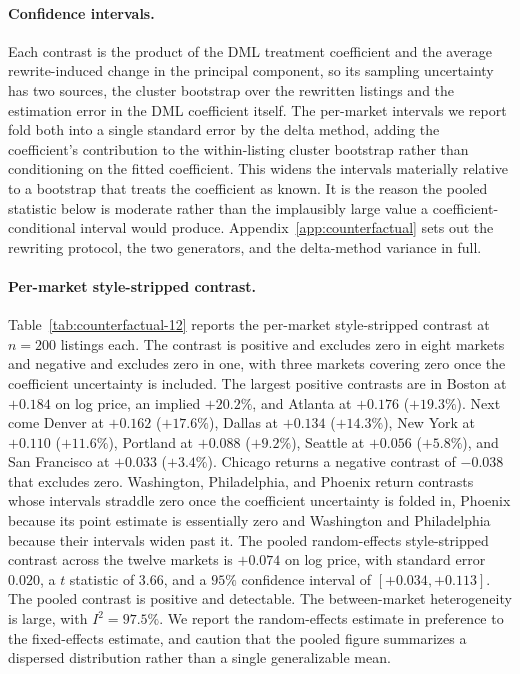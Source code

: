 \paragraph{Confidence intervals.} Each contrast is the product of the DML
treatment coefficient and the average rewrite-induced change in the principal
component, so its sampling uncertainty has two sources, the cluster bootstrap
over the rewritten listings and the estimation error in the DML coefficient
itself. The per-market intervals we report fold both into a single standard
error by the delta method, adding the coefficient's contribution to the
within-listing cluster bootstrap rather than conditioning on the fitted
coefficient. This widens the intervals materially relative to a bootstrap that treats the coefficient as known. It is the reason the pooled statistic below is moderate rather than the implausibly large value a coefficient-conditional interval would produce. Appendix~\ref{app:counterfactual} sets out the rewriting
protocol, the two generators, and the delta-method variance in full.

\paragraph{Per-market style-stripped contrast.}
Table~\ref{tab:counterfactual-12} reports the per-market style-stripped contrast
at $n=200$ listings each. The contrast is positive and excludes zero in eight
markets and negative and excludes zero in one, with three markets covering zero
once the coefficient uncertainty is included. The largest positive contrasts are in Boston at $+0.184$ on log price, an implied $+20.2\%$, and Atlanta at $+0.176$ ($+19.3\%$). Next come Denver at $+0.162$ ($+17.6\%$), Dallas at $+0.134$ ($+14.3\%$), New York at $+0.110$ ($+11.6\%$), Portland at $+0.088$ ($+9.2\%$), Seattle at $+0.056$ ($+5.8\%$), and San Francisco at $+0.033$ ($+3.4\%$). Chicago returns a negative contrast of $-0.038$ that excludes zero. Washington, Philadelphia, and Phoenix return contrasts whose intervals straddle zero once the coefficient uncertainty is folded in, Phoenix because its point estimate is essentially zero and Washington and Philadelphia because their intervals widen past it. The pooled random-effects style-stripped contrast across the twelve markets is $+0.074$ on log price, with standard error $0.020$, a $t$ statistic of $3.66$, and a $95\%$ confidence interval of $[+0.034, +0.113]$. The pooled contrast is positive and detectable. The between-market heterogeneity is large, with $I^2 = 97.5\%$. We report the random-effects estimate in preference to the fixed-effects estimate, and caution that the pooled figure summarizes a dispersed distribution rather than a single generalizable mean.

